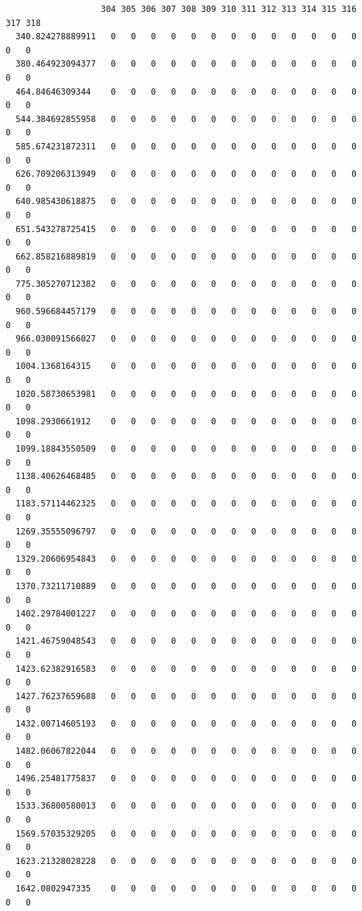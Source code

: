 \documentclass[
  letterpaper,
  DIV=11,
  numbers=noendperiod]{scrartcl}
\begin{document}
\begin{verbatim}
                   304 305 306 307 308 309 310 311 312 313 314 315 316 317 318
  340.824278889911   0   0   0   0   0   0   0   0   0   0   0   0   0   0   0
  380.464923094377   0   0   0   0   0   0   0   0   0   0   0   0   0   0   0
  464.84646309344    0   0   0   0   0   0   0   0   0   0   0   0   0   0   0
  544.384692855958   0   0   0   0   0   0   0   0   0   0   0   0   0   0   0
  585.674231872311   0   0   0   0   0   0   0   0   0   0   0   0   0   0   0
  626.709206313949   0   0   0   0   0   0   0   0   0   0   0   0   0   0   0
  640.985430618875   0   0   0   0   0   0   0   0   0   0   0   0   0   0   0
  651.543278725415   0   0   0   0   0   0   0   0   0   0   0   0   0   0   0
  662.858216889819   0   0   0   0   0   0   0   0   0   0   0   0   0   0   0
  775.305270712382   0   0   0   0   0   0   0   0   0   0   0   0   0   0   0
  960.596684457179   0   0   0   0   0   0   0   0   0   0   0   0   0   0   0
  966.030091566027   0   0   0   0   0   0   0   0   0   0   0   0   0   0   0
  1004.1368164315    0   0   0   0   0   0   0   0   0   0   0   0   0   0   0
  1020.58730653981   0   0   0   0   0   0   0   0   0   0   0   0   0   0   0
  1098.2930661912    0   0   0   0   0   0   0   0   0   0   0   0   0   0   0
  1099.18843550509   0   0   0   0   0   0   0   0   0   0   0   0   0   0   0
  1138.40626468485   0   0   0   0   0   0   0   0   0   0   0   0   0   0   0
  1183.57114462325   0   0   0   0   0   0   0   0   0   0   0   0   0   0   0
  1269.35555096797   0   0   0   0   0   0   0   0   0   0   0   0   0   0   0
  1329.20606954843   0   0   0   0   0   0   0   0   0   0   0   0   0   0   0
  1370.73211710889   0   0   0   0   0   0   0   0   0   0   0   0   0   0   0
  1402.29784001227   0   0   0   0   0   0   0   0   0   0   0   0   0   0   0
  1421.46759048543   0   0   0   0   0   0   0   0   0   0   0   0   0   0   0
  1423.62382916583   0   0   0   0   0   0   0   0   0   0   0   0   0   0   0
  1427.76237659688   0   0   0   0   0   0   0   0   0   0   0   0   0   0   0
  1432.00714605193   0   0   0   0   0   0   0   0   0   0   0   0   0   0   0
  1482.06067822044   0   0   0   0   0   0   0   0   0   0   0   0   0   0   0
  1496.25481775837   0   0   0   0   0   0   0   0   0   0   0   0   0   0   0
  1533.36800580013   0   0   0   0   0   0   0   0   0   0   0   0   0   0   0
  1569.57035329205   0   0   0   0   0   0   0   0   0   0   0   0   0   0   0
  1623.21328028228   0   0   0   0   0   0   0   0   0   0   0   0   0   0   0
  1642.0802947335    0   0   0   0   0   0   0   0   0   0   0   0   0   0   0

\end{verbatim}
\end{document}
